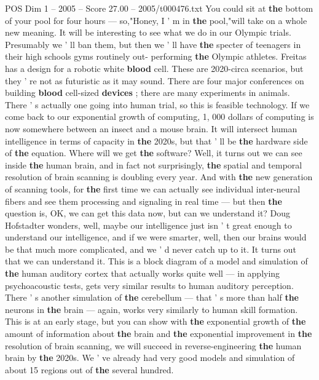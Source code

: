 \begin{textsample}{POS Dim 1 – 2005 – Score 27.00 – 2005/t000476.txt}
You could sit at \textbf{the} bottom of your pool for four hours — so,"Honey, I ' m in \textbf{the} pool,"will take on a whole new meaning.
It will be interesting to see what we do in our Olympic trials.
Presumably we ' ll ban them, but then we ' ll have \textbf{the} specter of teenagers in their high schools gyms routinely out- performing \textbf{the} Olympic athletes.
Freitas has a design for a robotic white \textbf{blood} cell.
These are 2020-circa scenarios, but they ' re not as futuristic as it may sound.
There are four major conferences on building \textbf{blood} cell-sized \textbf{devices} ; there are many experiments in animals.
There ' s actually one going into human trial, so this is feasible technology.
If we come back to our exponential growth of computing, 1, 000 dollars of computing is now somewhere between an insect and a mouse brain.
It will intersect human intelligence in terms of capacity in \textbf{the} 2020s, but that ' ll be \textbf{the} hardware side of \textbf{the} equation.
Where will we get \textbf{the} software?
Well, it turns out we can see inside \textbf{the} human brain, and in fact not surprisingly, \textbf{the} spatial and temporal resolution of brain scanning is doubling every year.
And with \textbf{the} new generation of scanning tools, for \textbf{the} first time we can actually see individual inter-neural fibers and see them processing and signaling in real time — but then \textbf{the} question is, OK, we can get this data now, but can we understand it?
Doug Hofstadter wonders, well, maybe our intelligence just isn ' t great enough to understand our intelligence, and if we were smarter, well, then our brains would be that much more complicated, and we ' d never catch up to it.
It turns out that we can understand it.
This is a block diagram of a model and simulation of \textbf{the} human auditory cortex that actually works quite well — in applying psychoacoustic tests, gets very similar results to human auditory perception.
There ' s another simulation of \textbf{the} cerebellum — that ' s more than half \textbf{the} neurons in \textbf{the} brain — again, works very similarly to human skill formation.
This is at an early stage, but you can show with \textbf{the} exponential growth of \textbf{the} amount of information about \textbf{the} brain and \textbf{the} exponential improvement in \textbf{the} resolution of brain scanning, we will succeed in reverse-engineering \textbf{the} human brain by \textbf{the} 2020s.
We ' ve already had very good models and simulation of about 15 regions out of \textbf{the} several hundred.

\end{textsample}
